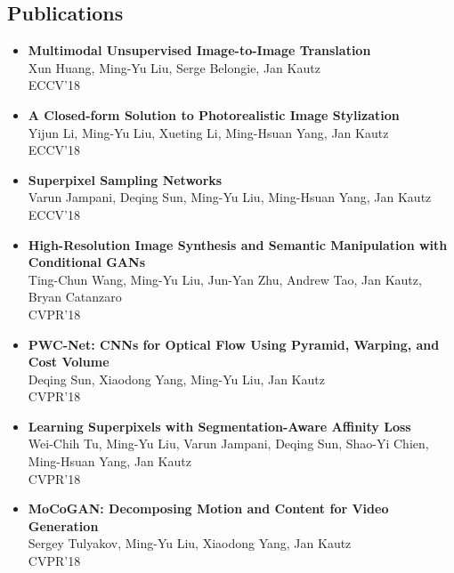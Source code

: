 \subsection*{Publications}
\begin{itemize}
	
\item {\bf Multimodal Unsupervised Image-to-Image Translation}\\
       Xun Huang, Ming-Yu Liu, Serge Belongie, Jan Kautz\\
       ECCV'18 \vspace{-2mm}
\item {\bf A Closed-form Solution to Photorealistic Image Stylization}\\
       Yijun Li, Ming-Yu Liu, Xueting Li, Ming-Hsuan Yang, Jan Kautz\\
       ECCV'18 \vspace{-2mm}
\item {\bf Superpixel Sampling Networks}\\
       Varun Jampani, Deqing Sun, Ming-Yu Liu, Ming-Hsuan Yang, Jan Kautz\\
       ECCV'18 \vspace{-2mm}
\item {\bf High-Resolution Image Synthesis and Semantic Manipulation with Conditional GANs}\\
       Ting-Chun Wang, Ming-Yu Liu, Jun-Yan Zhu, Andrew Tao, Jan Kautz, Bryan Catanzaro\\
       CVPR'18 \vspace{-2mm}
\item {\bf PWC-Net: CNNs for Optical Flow Using Pyramid, Warping, and Cost Volume}\\
       Deqing Sun, Xiaodong Yang, Ming-Yu Liu, Jan Kautz\\
       CVPR'18 \vspace{-2mm}
\item {\bf Learning Superpixels with Segmentation-Aware Affinity Loss}\\
       Wei-Chih Tu, Ming-Yu Liu, Varun Jampani, Deqing Sun, Shao-Yi Chien, Ming-Hsuan Yang, Jan Kautz\\
       CVPR'18 \vspace{-2mm}
\item {\bf MoCoGAN: Decomposing Motion and Content for Video Generation}\\
       Sergey Tulyakov, Ming-Yu Liu, Xiaodong Yang, Jan Kautz\\
       CVPR'18 \vspace{-2mm}

\end{itemize}
